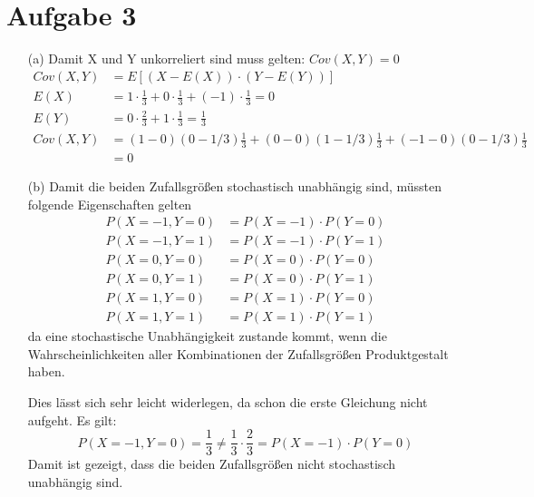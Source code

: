 \documentclass[10pt,a4paper]{article}
\begin{document}
\section*{Aufgabe 3}
\begin{itemize}
\item[(a)] Damit X und Y unkorreliert sind muss gelten: $Cov(X,Y) = 0$ \\
\begin{align*}
Cov(X,Y) &= E[(X - E(X)) \cdot (Y - E(Y))]\\
E(X) &= 1 \cdot \frac{1}{3} + 0 \cdot \frac{1}{3} + (-1) \cdot \frac{1}{3} = 0\\
E(Y) &= 0 \cdot \frac{2}{3} + 1 \cdot \frac{1}{3} = \frac{1}{3}\\
Cov(X,Y) &= (1-0)(0-1/3)\frac{1}{3} + (0-0)(1-1/3)\frac{1}{3} + (-1-0)(0-1/3)\frac{1}{3}\\
&= 0
\end{align*}

\item[(b)] Damit die beiden Zufallsgrößen stochastisch unabhängig sind, müssten folgende Eigenschaften gelten
\begin{align*}
P(X=-1,Y=0) &= P(X=-1) \cdot P(Y=0)\\
P(X=-1,Y=1) &= P(X=-1) \cdot P(Y=1)\\
P(X=0,Y=0) &= P(X=0) \cdot P(Y=0)\\
P(X=0,Y=1) &= P(X=0) \cdot P(Y=1)\\
P(X=1,Y=0) &= P(X=1) \cdot P(Y=0)\\
P(X=1,Y=1) &= P(X=1) \cdot P(Y=1)
\end{align*}
da eine stochastische Unabhängigkeit zustande kommt, wenn die Wahrscheinlichkeiten aller Kombinationen der Zufallsgrößen Produktgestalt haben.

Dies lässt sich sehr leicht widerlegen, da schon die erste Gleichung nicht aufgeht. Es gilt:
$$P(X=-1,Y=0) = \frac{1}{3} \neq \frac{1}{3} \cdot \frac{2}{3} = P(X=-1) \cdot P(Y=0)$$
Damit ist gezeigt, dass die beiden Zufallsgrößen nicht stochastisch unabhängig sind.

\end{itemize}
\end{document}
